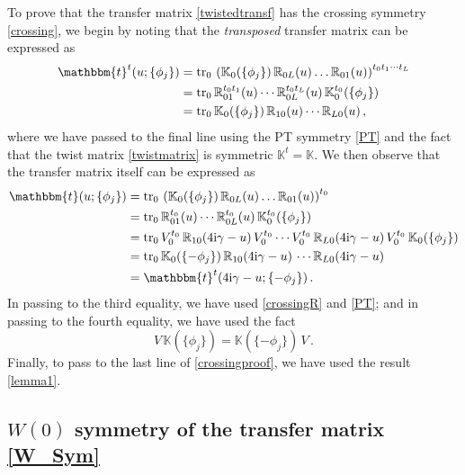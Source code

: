 \documentclass[12pt]{article}
\numberwithin{equation}{section}
\newcommand{\ri}{{\rm i}}
\begin{document}
To prove that the transfer matrix \eqref{twistedtransf} has
the crossing symmetry \eqref{crossing}, we begin by noting that the \emph{transposed} transfer matrix can be expressed as
\begin{align}
    \mathbbm{t}^t(u; \{\phi_j \}) & = \mathrm{tr}_{0}\, \left( \mathbb{K}_0(\{\phi_j \})\, \mathbb{R}_{0L}(u)\dots \mathbb{R}_{01}(u) \right)^{t_0 t_1 \cdots t_L} \nonumber \\
    & = \mathrm{tr}_{0}\, \mathbb{R}_{01}^{t_0 t_1}(u) \cdots \mathbb{R}_{0L}^{t_0 t_L}(u)\, \mathbb{K}^{t_0}_0(\{\phi_j \}) \nonumber \\
    & = \mathrm{tr}_{0}\, \mathbb{K}_0(\{\phi_j \})\, \mathbb{R}_{10}(u)  \cdots \mathbb{R}_{L0}(u) \,,
    \label{lemma1}
\end{align}
where we have passed to the final line using the PT symmetry \eqref{PT} and the fact that the twist matrix \eqref{twistmatrix} is symmetric $\mathbb{K}^t = \mathbb{K}$.
We then observe that the transfer matrix itself can be expressed as 
\begin{align}
    \mathbbm{t}(u; \{\phi_j \}) & = \mathrm{tr}_{0}\, \left( \mathbb{K}_0(\{\phi_j \})\, \mathbb{R}_{0L}(u)\dots \mathbb{R}_{01}(u) \right)^{t_0} \nonumber \\
    & = \mathrm{tr}_{0}\, \mathbb{R}_{01}^{t_0}(u) \cdots \mathbb{R}_{0L}^{t_0}(u)\, \mathbb{K}^{t_0}_0(\{\phi_j \}) \nonumber \\
    & = \mathrm{tr}_{0}\, V_0^{t_0}\, \mathbb{R}_{10}(4\ri \gamma-u)\, V_0^{t_0} \cdots V_0^{t_0}\, \mathbb{R}_{L0}(4\ri \gamma-u)\, V_0^{t_0}\, \mathbb{K}_0(\{\phi_j \}) \nonumber \\
    & = \mathrm{tr}_{0}\, \mathbb{K}_0(\{-\phi_j \})\, \mathbb{R}_{10}(4\ri \gamma-u)\,  \cdots  \mathbb{R}_{L0}(4\ri \gamma-u)\,  \nonumber \\
    & = \mathbbm{t}^t(4\ri \gamma-u; \{-\phi_j \})\,.
    \label{crossingproof}
\end{align}
In passing to the third equality, we have used \eqref{crossingR} and \eqref{PT}; and in passing to the fourth equality, we have used the fact
\begin{equation}
    V\, \mathbb{K}(\{\phi_j \}) = \mathbb{K}(\{-\phi_j \})\, V \,.
    \label{VK}
\end{equation}
Finally, to pass to the last line of \eqref{crossingproof}, we have used the result \eqref{lemma1}. 

\subsection{\texorpdfstring{$W(0)$}{W(0)} symmetry of the transfer matrix \eqref{W_Sym}}
\end{document}
